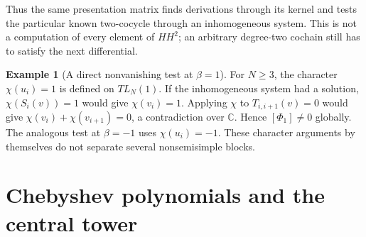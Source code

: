 \documentclass[a4paper,11pt,oneside,reqno]{amsart}
\theoremstyle{definition}
\newtheorem{example}[theorem]{Example}
\numberwithin{equation}{section}
\begin{document}
	Thus the same presentation matrix finds derivations through its kernel
	and tests the particular known two-cocycle through an inhomogeneous
	system.  This is not a computation of every element of $HH^2$; an
	arbitrary degree-two cochain still has to satisfy the next differential.
	
	\begin{example}[A direct nonvanishing test at $\beta=1$]
		For $N\ge3$, the character $\chi(u_i)=1$ is defined on $TL_N(1)$.
		If the inhomogeneous system had a solution, $\chi(S_i(v))=1$
		would give $\chi(v_i)=1$.  Applying $\chi$ to $T_{i,i+1}(v)=0$
		would give $\chi(v_i)+\chi(v_{i+1})=0$, a contradiction over
		$\mathbb C$.  Hence $[\Phi_1]\ne0$ globally.  The analogous test
		at $\beta=-1$ uses $\chi(u_i)=-1$.  These character arguments by
		themselves do not separate several nonsemisimple blocks.
	\end{example}
	
	
	\section{Chebyshev polynomials and the central tower}\label{tl:central}
\end{document}
